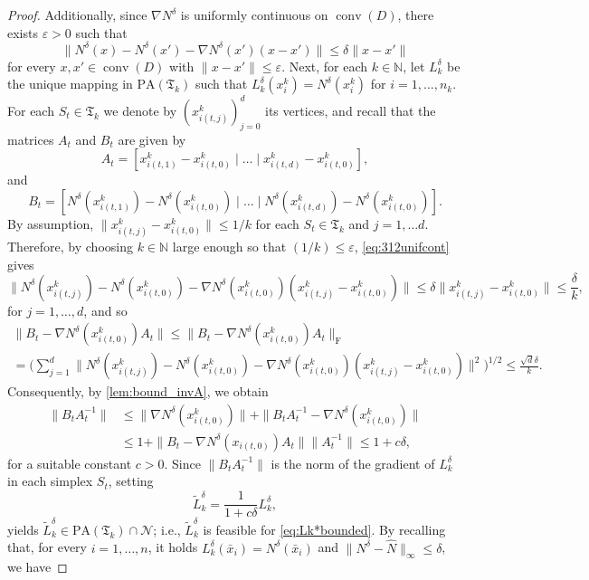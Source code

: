 \documentclass[onefignum,onetabnum]{siamonline250211}
\newcommand{\N}{\mathcal{N}}
\newcommand{\conv}{\operatorname{conv}}
\begin{document}
\begin{proof}
Additionally, since $\nabla N^\delta$ is uniformly continuous on $\conv (D)$, there exists $\varepsilon>0$ such that
\begin{equation}\label{eq:312unifcont}
\|N^\delta(x)-N^\delta(x')-\nabla N^\delta(x')(x-x')\|\leq \delta\|x-x'\|
\end{equation}
for every $x, x'\in\conv(D)$ with $\|x-x'\|\leq \varepsilon$. Next, for each $k\in\mathbb{N}$, let  $L_k^\delta$ be the unique mapping in $\mathrm{PA}(\mathfrak{T}_k)$ such that $L_k^\delta(x_i^k)=N^\delta(x^k_i)$ for $i=1,\ldots, n_k$. For each $S_t\in\mathfrak{T}_k$ we denote by $(x^k_{i(t,j)})_{j=0}^d$ its vertices, and recall that the matrices $A_t$ and $B_t$ are given by
$$
A_t=[x^k_{i(t,1)}-x^k_{i(t,0)}\mid\dots \mid x^k_{i(t,d)}-x^k_{i(t,0)}],
$$
and 
$$
B_t=[N^\delta(x^k_{i(t,1)})-N^\delta(x^k_{i(t,0)})\mid\ldots \mid N^\delta(x^k_{i(t,d)})-N^\delta(x^k_{i(t,0)})].
$$
By assumption, $\|x^k_{i(t,j)}-x^k_{i(t,0)}\|\leq 1/k$ for each $S_t\in\mathfrak{T}_k$ and $j=1,\dots d$. Therefore, by choosing $k\in\mathbb{N}$ large enough so that $(1/k)\leq\varepsilon$, \cref{eq:312unifcont} gives
\begin{equation*}
\|N^\delta(x^k_{i(t,j)})-N^\delta(x^k_{i(t,0)})-\nabla N^\delta(x^k_{i(t,0)})(x^k_{i(t,j)}-x^k_{i(t,0)})\|\leq \delta\|x^k_{i(t,j)}-x^k_{i(t,0)}\| \leq \frac{\delta}{k},
\end{equation*}
for $j=1,\ldots, d$, and so
\begin{multline*}
\|B_t-\nabla N^\delta(x^k_{i(t,0)})A_t\| \leq 
\|B_t-\nabla N^\delta(x^k_{i(t,0)})A_t\|_{\mathrm{F}} \\
= \Biggl( \sum_{j=1}^d \| N^\delta(x^k_{i(t,j)})-N^\delta(x^k_{i(t,0)})-\nabla N^\delta(x^k_{i(t,0)})(x^k_{i(t,j)}-x^k_{i(t,0)})  \|^2 \Biggr)^{1/2} \leq
\frac{\sqrt{d}\delta}{k}.    
\end{multline*}
Consequently, by \cref{lem:bound_invA}, we obtain
$$
\begin{aligned}
\|B_tA_t^{-1}\|&\leq \|\nabla N^\delta(x^k_{i(t,0)})\|+\|B_tA_t^{-1}- \nabla N^\delta(x^k_{i(t,0)})\|\\
&\leq 1+ \|B_t - \nabla N^\delta(x_{i(t,0)}) A_t \| \| A_t^{-1} \| \leq 1+c\delta,
\end{aligned}
$$
for a suitable constant $c>0$. Since $\|B_tA_t^{-1}\|$ is
the norm of the gradient of $L_k^\delta$ in each simplex $S_t$, setting
$$
\widetilde{L}^\delta_k=\frac{1}{1+c\delta}L^\delta_k,
$$
yields $\widetilde{L}^\delta_k\in\mathrm{PA}(\mathfrak{T}_k)\cap \N$; i.e., $\widetilde{L}^\delta_k$ is feasible for \cref{eq:Lk*bounded}. By recalling that, for every $i=1,\ldots, n$, it holds $L^\delta_k(\bar x_i)=N^\delta(\bar x_i)$ and $\|N^\delta-\widehat{N}\|_\infty\leq \delta$, we have

\end{proof}
\end{document}
